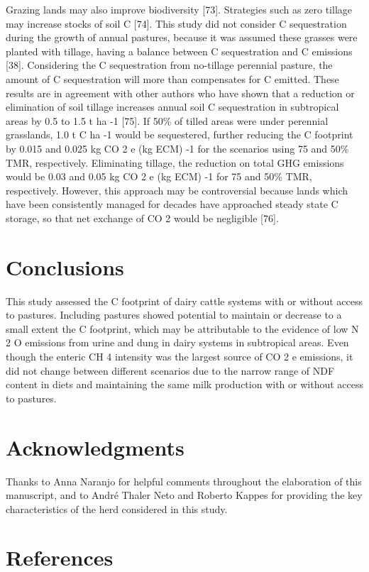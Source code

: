 \documentclass[11pt,a4paper]{article}
\begin{document}
Grazing lands may also improve biodiversity [73]. Strategies such as zero tillage may increase stocks of soil C [74]. This study did not consider C sequestration during the growth of annual pastures, because it was assumed these grasses were planted with tillage, having a balance between C sequestration and C emissions [38]. Considering the C sequestration from no-tillage perennial pasture, the amount of C sequestration will more than compensates for C emitted. These results are in agreement with other authors who have shown that a reduction or elimination of soil tillage increases annual soil C sequestration in subtropical areas by 0.5 to 1.5 t ha -1 [75]. If 50\% of tilled areas were under perennial grasslands, 1.0 t C ha -1 would be sequestered, further reducing the C footprint by 0.015 and 0.025 kg CO 2 e (kg ECM) -1 for the scenarios using 75 and 50\% TMR, respectively. Eliminating tillage, the reduction on total GHG emissions would be 0.03 and 0.05 kg CO 2 e (kg ECM) -1 for 75 and 50\% TMR, respectively. However, this approach may be controversial because lands which have been consistently managed for decades have approached steady state C storage, so that net exchange of CO 2 would be negligible [76].

\section{Conclusions}

This study assessed the C footprint of dairy cattle systems with or without access to pastures. Including pastures showed potential to maintain or decrease to a small extent the C footprint, which may be attributable to the evidence of low N 2 O emissions from urine and dung in dairy systems in subtropical areas. Even though the enteric CH 4 intensity was the largest source of CO 2 e emissions, it did not change between different scenarios due to the narrow range of NDF content in diets and maintaining the same milk production with or without access to pastures.

\section{Acknowledgments}

Thanks to Anna Naranjo for helpful comments throughout the elaboration of this manuscript, and to André Thaler Neto and Roberto Kappes for providing the key characteristics of the herd considered in this study.

\section{References}
\end{document}
